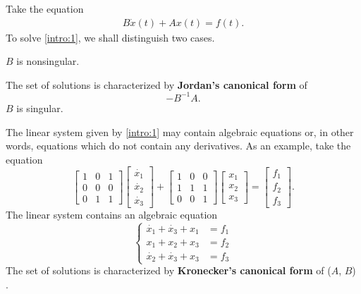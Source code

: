 Take the equation
\begin{gather} \label{intro:1}
    B\dot{x}(t) + Ax(t) = f(t).
\end{gather}
To solve \eqref{intro:1}, we shall distinguish two cases.
\begin{cs}
    \case $B$ is nonsingular.

        The set of solutions is characterized by \textbf{Jordan's canonical form} of \[-B^{-1}A.\]
    \case $B$ is singular.

        The linear system given by \eqref{intro:1} may contain algebraic equations or, in other words,
        equations which do not contain any derivatives. As an example, take the equation
        \[
            \begin{bmatrix}
                1 & 0 & 1 \\
                0 & 0 & 0 \\
                0 & 1 & 1
            \end{bmatrix}
            \begin{bmatrix}
                \dot{x_1} \\
                \dot{x_2} \\
                \dot{x_3}
            \end{bmatrix} + 
            \begin{bmatrix}
                1 & 0 & 0 \\
                1 & 1 & 1 \\
                0 & 0 & 1
            \end{bmatrix}
            \begin{bmatrix}
                x_1 \\
                x_2 \\
                x_3
            \end{bmatrix}
            = \begin{bmatrix}
                f_1 \\
                f_2 \\
                f_3
            \end{bmatrix}.
        \]
        The linear system contains an algebraic equation
        \begin{equation*}
            \left\{
                \begin{aligned}
                    \dot{x_1} + \dot{x_3} + x_1 &= f_1 \\
                    x_1 + x_2 + x_3 &= f_2 \\
                    \dot{x_2} + \dot{x_3} + x_3 &= f_3
                \end{aligned}
            \right.
        \end{equation*}
        The set of solutions is characterized by \textbf{Kronecker's canonical form} of ($A$, $B$)
        \cite{gantmacher, kunkel-mehrmann}.

\end{cs}
